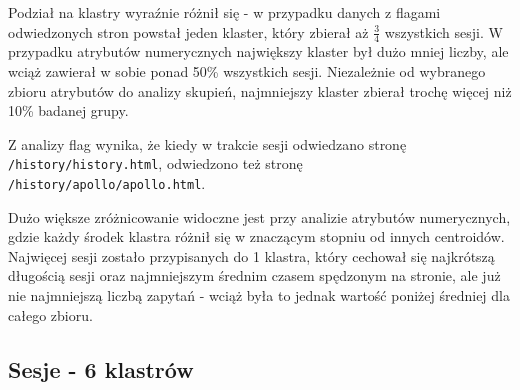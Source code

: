 \documentclass{classrep}
\begin{document}
    \begin{table}[H]
    \centering
    \caption{Przypisanie obserwacji dla 3 klastrów z atrybutami numerycznymi podczas analizy sesji}
    \label{tab:num_3clusters_pages_sum}
    \end{table}
    
    Podział na klastry wyraźnie różnił się - w przypadku danych z flagami odwiedzonych stron powstał jeden klaster, który zbierał aż \( \frac{3}{4} \) wszystkich sesji. W przypadku atrybutów numerycznych największy klaster był dużo mniej liczby, ale wciąż zawierał w sobie ponad 50\% wszystkich sesji. Niezależnie od wybranego zbioru atrybutów do analizy skupień, najmniejszy klaster zbierał trochę więcej niż 10\% badanej grupy.
    
    Z analizy flag wynika, że kiedy w trakcie sesji odwiedzano stronę\\ \verb|/history/history.html|, odwiedzono też stronę\\ \verb|/history/apollo/apollo.html|. 
    
    Dużo większe zróżnicowanie widoczne jest przy analizie atrybutów numerycznych, gdzie każdy środek klastra różnił się w znaczącym stopniu od innych centroidów. Najwięcej sesji zostało przypisanych do 1 klastra, który cechował się najkrótszą długością sesji oraz najmniejszym średnim czasem spędzonym na stronie, ale już nie najmniejszą liczbą zapytań - wciąż była to jednak wartość poniżej średniej dla całego zbioru. 
    
    \subsection{Sesje - 6 klastrów}
    
\end{document}
